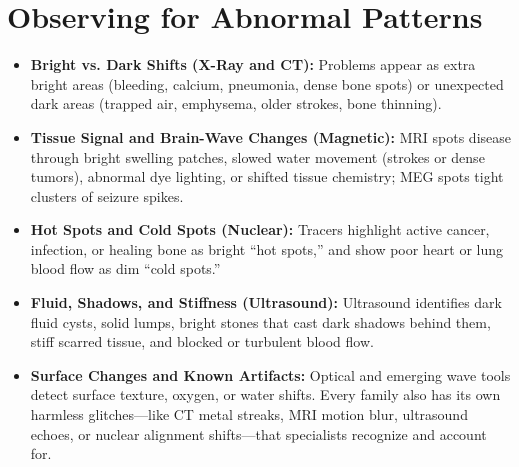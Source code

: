 \section{Observing for Abnormal Patterns}
\begin{itemize}
  \item \textbf{Bright vs. Dark Shifts (X-Ray and CT):} Problems appear as extra bright areas (bleeding, calcium, pneumonia, dense bone spots) or unexpected dark areas (trapped air, emphysema, older strokes, bone thinning).
  \item \textbf{Tissue Signal and Brain-Wave Changes (Magnetic):} MRI spots disease through bright swelling patches, slowed water movement (strokes or dense tumors), abnormal dye lighting, or shifted tissue chemistry; MEG spots tight clusters of seizure spikes.
  \item \textbf{Hot Spots and Cold Spots (Nuclear):} Tracers highlight active cancer, infection, or healing bone as bright ``hot spots,'' and show poor heart or lung blood flow as dim ``cold spots.''
  \item \textbf{Fluid, Shadows, and Stiffness (Ultrasound):} Ultrasound identifies dark fluid cysts, solid lumps, bright stones that cast dark shadows behind them, stiff scarred tissue, and blocked or turbulent blood flow.
  \item \textbf{Surface Changes and Known Artifacts:} Optical and emerging wave tools detect surface texture, oxygen, or water shifts. Every family also has its own harmless glitches---like CT metal streaks, MRI motion blur, ultrasound echoes, or nuclear alignment shifts---that specialists recognize and account for.
\end{itemize}

